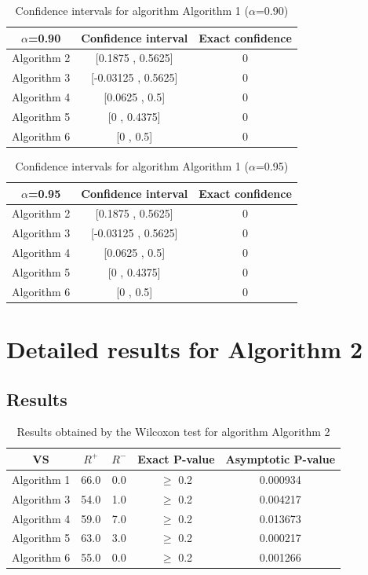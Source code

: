 \documentclass[a4paper,10pt]{article}
\begin{document}
\begin{table}[!htp]
\centering\small
\begin{tabular}{
|c|c|c|}
\hline
 $\alpha$=0.90 & Confidence interval & Exact confidence \\ \hline 
Algorithm 2 & [0.1875 , 0.5625] & 0\\ \hline 
Algorithm 3 & [-0.03125 , 0.5625] & 0\\ \hline 
Algorithm 4 & [0.0625 , 0.5] & 0\\ \hline 
Algorithm 5 & [0 , 0.4375] & 0\\ \hline 
Algorithm 6 & [0 , 0.5] & 0\\ \hline 

\end{tabular}
\caption{Confidence intervals for algorithm Algorithm 1 ($\alpha$=0.90)}
\end{table}
\begin{table}[!htp]
\centering\small
\begin{tabular}{
|c|c|c|}
\hline
 $\alpha$=0.95 & Confidence interval & Exact confidence \\ \hline 
Algorithm 2 & [0.1875 , 0.5625] & 0\\ \hline 
Algorithm 3 & [-0.03125 , 0.5625] & 0\\ \hline 
Algorithm 4 & [0.0625 , 0.5] & 0\\ \hline 
Algorithm 5 & [0 , 0.4375] & 0\\ \hline 
Algorithm 6 & [0 , 0.5] & 0\\ \hline 

\end{tabular}
\caption{Confidence intervals for algorithm Algorithm 1 ($\alpha$=0.95)}
\end{table}

 \clearpage 


\section{Detailed results for Algorithm 2}


\subsection{Results}

\begin{table}[!htp]
\centering\small
\begin{tabular}{
|c|c|c|c|c|}
\hline
 VS & $R^{+}$ & $R^{-}$ & Exact P-value & Asymptotic P-value \\ \hline 
Algorithm 1 & 66.0 & 0.0 & $\geq$ 0.2 & 0.000934\\ \hline 
Algorithm 3 & 54.0 & 1.0 & $\geq$ 0.2 & 0.004217\\ \hline 
Algorithm 4 & 59.0 & 7.0 & $\geq$ 0.2 & 0.013673\\ \hline 
Algorithm 5 & 63.0 & 3.0 & $\geq$ 0.2 & 0.000217\\ \hline 
Algorithm 6 & 55.0 & 0.0 & $\geq$ 0.2 & 0.001266\\ \hline 

\end{tabular}
\caption{Results obtained by the Wilcoxon test for algorithm Algorithm 2}
\end{table}
\end{document}
